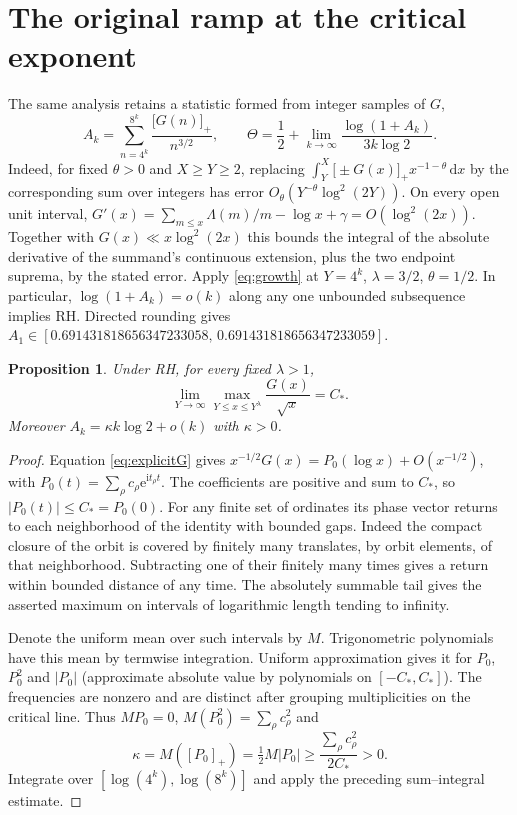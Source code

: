 \documentclass[11pt,a4paper]{article}
\newtheorem{proposition}[theorem]{Proposition}
\newcommand{\ii}{\mathrm i}
\newcommand{\dd}{\,\mathrm d}
\newcommand{\ee}{\mathrm e}
\newcommand{\pos}[1]{\bigl[#1\bigr]_+}
\begin{document}
\section{The original ramp at the critical exponent}\label{sec:endpoint}
The same analysis retains a statistic formed from integer samples of $G$,
\begin{equation}\label{eq:Ak}
 A_k=\sum_{n=4^k}^{8^k}\frac{\pos{G(n)}}{n^{3/2}},
 \qquad \Theta=\frac12+\lim_{k\to\infty}\frac{\log(1+A_k)}{3k\log2}.
\end{equation}
Indeed, for fixed $\theta>0$ and $X\ge Y\ge2$, replacing $\int_Y^X\pos{\pm G(x)}x^{-1-\theta}\dd x$ by the corresponding sum over integers has error $O_\theta(Y^{-\theta}\log^2(2Y))$. On every open unit interval, $G'(x)=\sum_{m\le x}\Lambda(m)/m-\log x+\gamma=O(\log^2(2x))$. Together with $G(x)\ll x\log^2(2x)$ this bounds the integral of the absolute derivative of the summand's continuous extension, plus the two endpoint suprema, by the stated error. Apply \eqref{eq:growth} at $Y=4^k$, $\lambda=3/2$, $\theta=1/2$. In particular, $\log(1+A_k)=o(k)$ along any one unbounded subsequence implies RH. Directed rounding gives $A_1\in[0.691431818656347233058,\,0.691431818656347233059]$.

\begin{proposition}\label{prop:peak}
Under RH, for every fixed $\lambda>1$,
\[
 \lim_{Y\to\infty}\max_{Y\le x\le Y^\lambda}\frac{G(x)}{\sqrt{x}}=C_*.
\]
Moreover $A_k=\kappa k\log2+o(k)$ with $\kappa>0$.
\end{proposition}
\begin{proof}
Equation \eqref{eq:explicitG} gives $x^{-1/2}G(x)=P_0(\log x)+O(x^{-1/2})$, with $P_0(t)=\sum_\rho c_\rho\ee^{\ii t_\rho t}$. The coefficients are positive and sum to $C_*$, so $|P_0(t)|\le C_*=P_0(0)$. For any finite set of ordinates its phase vector returns to each neighborhood of the identity with bounded gaps. Indeed the compact closure of the orbit is covered by finitely many translates, by orbit elements, of that neighborhood. Subtracting one of their finitely many times gives a return within bounded distance of any time. The absolutely summable tail gives the asserted maximum on intervals of logarithmic length tending to infinity.

Denote the uniform mean over such intervals by $M$. Trigonometric polynomials have this mean by termwise integration. Uniform approximation gives it for $P_0$, $P_0^2$ and $|P_0|$ (approximate absolute value by polynomials on $[-C_*,C_*]$). The frequencies are nonzero and are distinct after grouping multiplicities on the critical line. Thus $MP_0=0$, $M(P_0^2)=\sum_\rho c_\rho^2$ and
\[
 \kappa=M([P_0]_+)=\tfrac12 M|P_0|
       \ge\frac{\sum_\rho c_\rho^2}{2C_*}>0 .
\]
Integrate over $[\log(4^k),\log(8^k)]$ and apply the preceding sum--integral estimate.
\end{proof}
\end{document}
